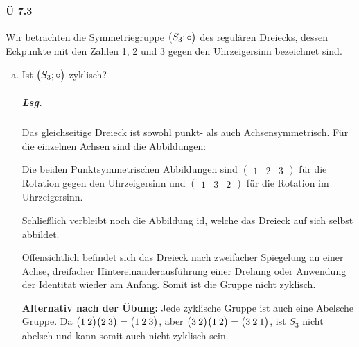 \documentclass{scrreprt}
\begin{document}
\paragraph{Ü 7.3} Wir betrachten die Symmetriegruppe $\qty\big(S_3; \circ)$ des
regulären Dreiecks, dessen Eckpunkte mit den Zahlen 1, 2 und 3 gegen den
Uhrzeigersinn bezeichnet sind.
\begin{enumerate}[(a)]
\item Ist $\qty\big(S_3; \circ)$ zyklisch?

  \subparagraph{Lsg.} Das gleichseitige Dreieck ist sowohl punkt- als auch
  Achsensymmetrisch.
  Für die einzelnen Achsen sind die Abbildungen:


  Die beiden Punktsymmetrischen Abbildungen sind
  $\begin{pmatrix} 1 & 2 & 3 \end{pmatrix}$ für die Rotation gegen den
  Uhrzeigersinn und
  $\begin{pmatrix} 1 & 3 & 2 \end{pmatrix}$ für die Rotation im Uhrzeigersinn.

  Schließlich verbleibt noch die Abbildung $\text{id}$, welche das Dreieck auf
  sich selbst abbildet.

  Offensichtlich befindet sich das Dreieck nach zweifacher Spiegelung an einer
  Achse, dreifacher Hintereinanderausführung einer Drehung oder Anwendung der
  Identität wieder am Anfang.
  Somit ist die Gruppe nicht zyklisch.

  \textbf{Alternativ nach der Übung:} Jede zyklische Gruppe ist auch eine Abelsche
  Gruppe.
  Da $\qty\big(1\:2)\qty\big(2\:3)=\qty\big(1\:2\:3)$, aber
  $\qty\big(3\:2)\qty\big(1\:2)=\qty\big(3\:2\:1)$, ist $S_3$ nicht abelsch und
  kann somit auch nicht zyklisch sein.


\end{enumerate}
\end{document}
